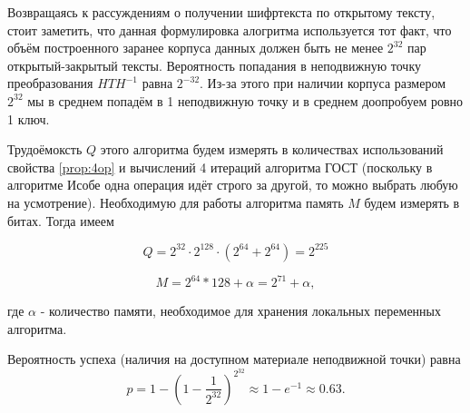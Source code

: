 \documentclass[a4paper,12pt]{article}
\theoremstyle{definition}
\begin{document}
	Возвращаясь к рассуждениям о получении шифртекста по открытому тексту, стоит заметить, что данная формулировка алогритма используется тот факт, что объём построенного заранее корпуса данных должен быть не менее $2^{32}$ пар открытый-закрытый тексты. Вероятность попадания в неподвижную точку преобразования $H T H^{-1}$ равна $2^{-32}$. Из-за этого при наличии корпуса размером $2^{32}$ мы в среднем попадём в 1 неподвижную точку и в среднем доопробуем ровно 1 ключ.
	
	Трудоёмоксть $Q$ этого алгоритма будем измерять в количествах использований свойства \ref{prop:4op} и вычислений 4 итераций алгоритма ГОСТ (поскольку в алгоритме Исобе одна операция идёт строго за другой, то можно выбрать любую на усмотрение). Необходимую для работы алгоритма память $M$ будем измерять в битах. Тогда имеем
	
	\[ Q = 2^{32} \cdot 2^{128} \cdot (2^{64} + 2^{64}) = 2^{225} \]
	
	\[ M = 2^{64} * 128 + \alpha = 2^{71} + \alpha,  \]
		
	где $\alpha$ - количество памяти, необходимое для хранения локальных переменных алгоритма.
	
	Вероятность успеха (наличия на доступном материале неподвижной точки) равна	
	\[ p=1-(1-\frac{1}{2^{32}})^{2^{32}} \approx 1 - e^{-1} \approx 0.63. \]
		
\end{document}
